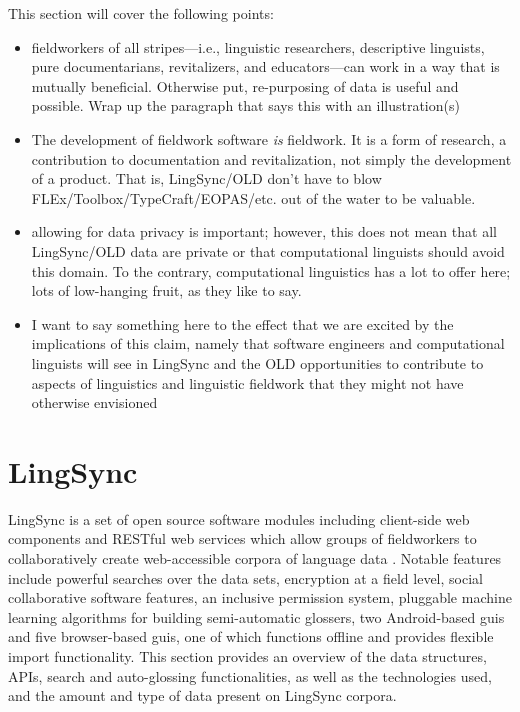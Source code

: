 \documentclass[11pt]{article}
\begin{document}
This section will cover the following points:

\begin{itemize}
    \item fieldworkers of all stripes---i.e., linguistic researchers,
        descriptive linguists, pure documentarians, revitalizers, and
        educators---can work in a way that is mutually beneficial.
        Otherwise put, re-purposing of data is useful and possible.
        Wrap up the paragraph that says this with an illustration(s)
    \item The development of fieldwork software \textit{is} fieldwork. It is
        a form of research, a contribution to documentation and revitalization,
        not simply the development of a product. That is, LingSync/OLD don't have
        to blow FLEx/Toolbox/TypeCraft/EOPAS/etc. out of the water to be valuable.
    \item allowing for data privacy is important; however, this does not mean
        that all LingSync/OLD data are private or that computational linguists
        should avoid this domain. To the contrary, computational linguistics has
        a lot to offer here; lots of low-hanging fruit, as they like to say.
    \item I want to say something here to the effect that we are excited by
        the implications of this claim, namely that software engineers and
        computational linguists will see in LingSync and the OLD opportunities
        to contribute to aspects of linguistics and linguistic fieldwork that
        they might not have otherwise envisioned
\end{itemize}









\section{LingSync}\label{sec:lingsync}

LingSync is a set of open source software modules including client-side web
components and RESTful web services which allow groups of fieldworkers to
collaboratively create web-accessible corpora of language data
\cite{lingsync:2012}. Notable features include powerful searches over the data
sets, encryption at a field level, social collaborative software features, an
inclusive permission system, pluggable machine learning algorithms for building
semi-automatic glossers, two Android-based \glspl{gui} and five browser-based \glspl{gui},
one of which functions offline and provides flexible import functionality. This
section provides an overview of the data structures, APIs, search and
auto-glossing functionalities, as well as the technologies used, and the amount
and type of data present on LingSync corpora.%
\end{document}
